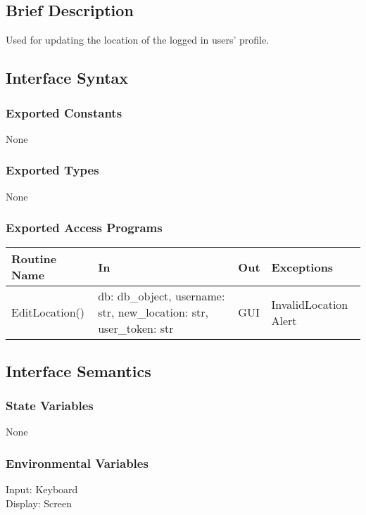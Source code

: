 \documentclass[12pt, titlepage]{article}
\begin{document}
\subsection* {Brief Description}
Used for updating the location of the logged in users' profile.


\subsection* {Interface Syntax}
\subsubsection* {Exported Constants}
None

\subsubsection* {Exported Types}
None

\subsubsection* {Exported Access Programs}
\begin{table}[!htb]
    \centering
    \begin{tabular}{|p{3cm}|p{3cm}|p{3cm}|p{4.5cm}|}
        \hline
        \textbf{Routine Name} & \textbf{In} & \textbf{Out} & \textbf{Exceptions} \\
        \hline
         EditLocation() & db: db\_object, username: str, new\_location: str, user\_token: str  & GUI & InvalidLocation Alert\\
        \hline
    \end{tabular}
\end{table}

\subsection{Interface Semantics}
\subsubsection{State Variables}
None

\subsubsection{Environmental Variables}
Input: Keyboard\\
Display: Screen
\end{document}
